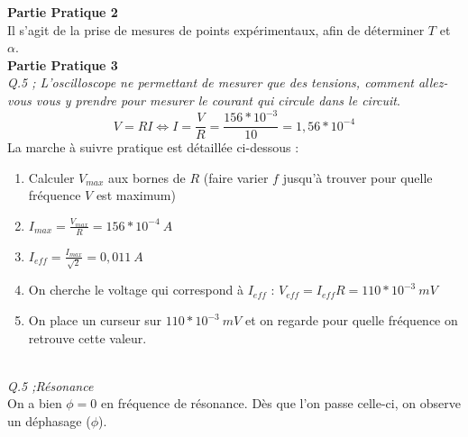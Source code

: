 \documentclass	[11pt, a4paper, openany]{book}
\begin{document}
		\textbf{Partie Pratique 2}\\
		Il s'agit de la prise de mesures de points expérimentaux, afin de déterminer $T$ et $\alpha$.\\
		
		\textbf{Partie Pratique 3}\\
		\textit{Q.5 ; L'oscilloscope ne permettant de mesurer que des tensions, comment allez-vous vous y prendre pour mesurer le courant qui circule dans le circuit}.
		\begin{equation}
			V = RI \Leftrightarrow I = \frac{V}{R} = \frac{156*10^{-3
				}}{10} = 1,56*10^{-4}
		\end{equation}
		La marche à suivre pratique est détaillée ci-dessous :
		\begin{enumerate}
			\item Calculer $V_{max}$ aux bornes de $R$ (faire varier $f$ jusqu'à trouver pour quelle fréquence $V$ est maximum)
			\item $I_{max} = \frac{V_{max}}{R} = 156*10^{-4}\ A$
			\item $I_{eff} = \frac{I_{max}}{\sqrt{2}} = 0,011\ A$
			\item On cherche le voltage qui correspond à $I_{eff}$ : $V_{eff} = I_{eff} R = 110*10^{-3}\ mV$
			\item On place un curseur sur $110*10^{-3}\ mV$ et on regarde pour quelle fréquence on retrouve cette valeur.
		\end{enumerate}
		\ \\
		\textit{Q.5 ;Résonance}\\
		On a bien $\phi = 0$ en fréquence de résonance. Dès que l'on passe celle-ci, on observe un déphasage ($\phi$).\\
		
\end{document}
